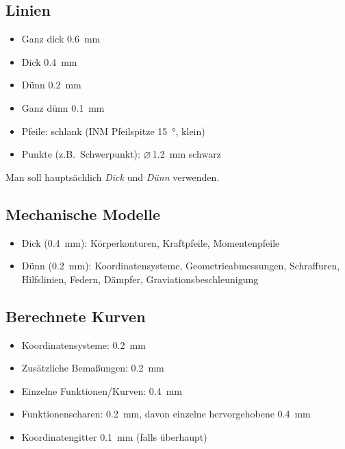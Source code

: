 \subsection*{Linien}
\begin{itemize}
\setlength\itemsep{\itemizeskip}
\item Ganz dick \SI{0.6}{\milli\metre}
\item Dick \SI{0.4}{\milli\metre}
\item Dünn \SI{0.2}{\milli\metre}
\item Ganz dünn \SI{0.1}{\milli\metre}
\item Pfeile: schlank (INM Pfeilspitze \SI{15}{\degree}, klein)
\item Punkte (z.B.\ Schwerpunkt): $\diameter$\,\SI{1.2}{\milli\metre} schwarz
\end{itemize}
Man soll hauptsächlich \emph{Dick} und \emph{Dünn} verwenden.

\subsection*{Mechanische Modelle}
\begin{itemize}
\setlength\itemsep{\itemizeskip}
\item Dick (\SI{0.4}{\milli\metre}): Körperkonturen, Kraftpfeile, Momentenpfeile
\item Dünn (\SI{0.2}{\milli\metre}): Koordinatensysteme, Geometrieabmessungen, Schraffuren, Hilfslinien, Federn, Dämpfer, Graviationsbeschleunigung
\end{itemize}

\subsection*{Berechnete Kurven}
\begin{itemize}
   \setlength\itemsep{\itemizeskip}
\item Koordinatensysteme: \SI{0.2}{\milli\metre}
\item Zusätzliche Bema{\ss}ungen: \SI{0.2}{\milli\metre}
\item Einzelne Funktionen/Kurven: \SI{0.4}{\milli\metre}
\item Funktionenscharen: \SI{0.2}{\milli\metre}, davon einzelne hervorgehobene \SI{0.4}{\milli\metre}
\item Koordinatengitter \SI{0.1}{\milli\metre} (falls überhaupt)
\end{itemize}


